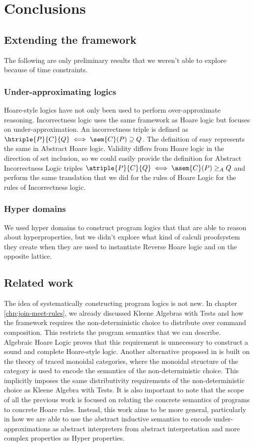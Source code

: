 \chapter{Conclusions}

\section{Extending the framework}
The following are only preliminary results that we weren't able to explore
because of time constraints.

\subsection{Under-approximating logics}
Hoare-style logics have not only been used to perform over-approximate
reasoning. Incorrectness logic \cite{OHearn19} uses the same framework as Hoare
logic but focuses on under-approximation. An incorrectness triple is defined as
$\htriple{P}{C}{Q} \iff \sem{C}(P) \supseteq Q$. The definition of easy
represents the same in Abstract Hoare logic. Validity differs from Hoare logic
in the direction of set inclusion, so we could easily provide the definition
for Abstract Incorrectness Logic triples $\atriple{P}{C}{Q} \iff \asem{C}(P)
\geq_A Q$ and perform the same translation that we did for the rules of Hoare
Logic for the rules of Incorrectness logic.

\subsection{Hyper domains}
We used hyper domains to construct program logics that that are able to reason
about hyperproperties, but we didn't explore what kind of calculi proofsystem 
they create when they are used to instantiate Reverse Hoare logic and on the 
opposite lattice.

\section{Related work}
The idea of systematically constructing program logics is not new. In chapter
\ref{chp:join-meet-rules}, we already discussed Kleene Algebras with Tests
\cite{Kozen97} and how the framework requires the non-deterministic choice to
distribute over command composition. This restricts the program semantics that
we can describe. Algebraic Hoare Logic proves that this requirement is
unnecessary to construct a sound and complete Hoare-style logic. Another
alternative proposed in \cite{Martin06} is built on the theory of traced
monoidal categories, where the monoidal structure of the category is used to
encode the semantics of the non-deterministic choice. This implicitly imposes
the same distributivity requirements of the non-deterministic choice as Kleene
Algebra with Tests. 
It is also important to note that the scope of all the
previous work is focused on relating the concrete semantics of programs to
concrete Hoare rules. Instead, this work aims to be more general, particularly
in how we are able to use the abstract inductive semantics to encode
under-approximations as abstract interpreters from abstract interpretation and
more complex properties as Hyper properties.

